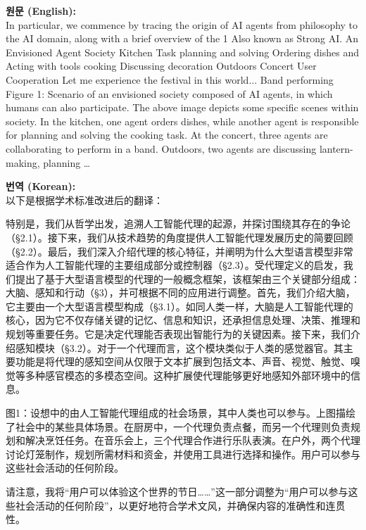 \documentclass[12pt,a4paper]{article}
\begin{document}
\begin{mdframed}[style=orig]
\noindent\textbf{\small 원문 (English):}\\[2pt]
\small In particular, we commence by tracing the origin of AI agents from philosophy to the AI domain, along with a brief overview of the 1 Also known as Strong AI. An Envisioned Agent Society Kitchen Task planning and solving Ordering dishes and Acting with tools cooking Discussing decoration Outdoors Concert User Cooperation Let me experience the festival in this world... Band performing Figure 1: Scenario of an envisioned society composed of AI agents, in which humans can also participate. The above image depicts some specific scenes within society. In the kitchen, one agent orders dishes, while another agent is responsible for planning and solving the cooking task. At the concert, three agents are collaborating to perform in a band. Outdoors, two agents are discussing lantern-making, planning \ldots
\end{mdframed}
\vspace{0.4em}

\begin{mdframed}[style=ko]
\noindent\textbf{\small 번역 (Korean):}\\[2pt]
以下是根据学术标准改进后的翻译：

特别是，我们从哲学出发，追溯人工智能代理的起源，并探讨围绕其存在的争论（§2.1）。接下来，我们从技术趋势的角度提供人工智能代理发展历史的简要回顾（§2.2）。最后，我们深入介绍代理的核心特征，并阐明为什么大型语言模型非常适合作为人工智能代理的主要组成部分或控制器（§2.3）。受代理定义的启发，我们提出了基于大型语言模型的代理的一般概念框架，该框架由三个关键部分组成：大脑、感知和行动（§3），并可根据不同的应用进行调整。首先，我们介绍大脑，它主要由一个大型语言模型构成（§3.1）。如同人类一样，大脑是人工智能代理的核心，因为它不仅存储关键的记忆、信息和知识，还承担信息处理、决策、推理和规划等重要任务。它是决定代理能否表现出智能行为的关键因素。接下来，我们介绍感知模块（§3.2）。对于一个代理而言，这个模块类似于人类的感觉器官。其主要功能是将代理的感知空间从仅限于文本扩展到包括文本、声音、视觉、触觉、嗅觉等多种感官模态的多模态空间。这种扩展使代理能够更好地感知外部环境中的信息。

图1：设想中的由人工智能代理组成的社会场景，其中人类也可以参与。上图描绘了社会中的某些具体场景。在厨房中，一个代理负责点餐，而另一个代理则负责规划和解决烹饪任务。在音乐会上，三个代理合作进行乐队表演。在户外，两个代理讨论灯笼制作，规划所需材料和资金，并使用工具进行选择和操作。用户可以参与这些社会活动的任何阶段。

请注意，我将“用户可以体验这个世界的节日……”这一部分调整为“用户可以参与这些社会活动的任何阶段”，以更好地符合学术文风，并确保内容的准确性和连贯性。
\end{mdframed}
\vspace{1em}
\end{document}
